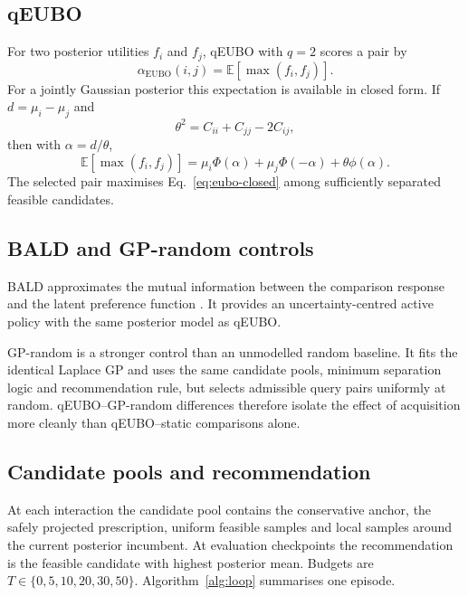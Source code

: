 \documentclass[preprint,12pt]{elsarticle}
\begin{document}
\subsection{qEUBO}

For two posterior utilities $f_i$ and $f_j$, qEUBO with $q=2$ scores a pair by
\begin{equation}
 \alpha_{\mathrm{EUBO}}(i,j)=\mathbb E[\max(f_i,f_j)].
 \label{eq:eubo}
\end{equation}
For a jointly Gaussian posterior this expectation is available in closed form. If $d=\mu_i-\mu_j$ and
\begin{equation}
 \theta^2=C_{ii}+C_{jj}-2C_{ij},
\end{equation}
then with $\alpha=d/\theta$,
\begin{equation}
 \mathbb E[\max(f_i,f_j)] = \mu_i\Phi(\alpha)+\mu_j\Phi(-\alpha)+\theta\phi(\alpha).
 \label{eq:eubo-closed}
\end{equation}
The selected pair maximises Eq.~\eqref{eq:eubo-closed} among sufficiently separated feasible candidates.

\subsection{BALD and GP-random controls}

BALD approximates the mutual information between the comparison response and the latent preference function \cite{houlsby2011}. It provides an uncertainty-centred active policy with the same posterior model as qEUBO.

GP-random is a stronger control than an unmodelled random baseline. It fits the identical Laplace GP and uses the same candidate pools, minimum separation logic and recommendation rule, but selects admissible query pairs uniformly at random. qEUBO--GP-random differences therefore isolate the effect of acquisition more cleanly than qEUBO--static comparisons alone.

\subsection{Candidate pools and recommendation}

At each interaction the candidate pool contains the conservative anchor, the safely projected prescription, uniform feasible samples and local samples around the current posterior incumbent. At evaluation checkpoints the recommendation is the feasible candidate with highest posterior mean. Budgets are $T\in\{0,5,10,20,30,50\}$. Algorithm~\ref{alg:loop} summarises one episode.
\end{document}
